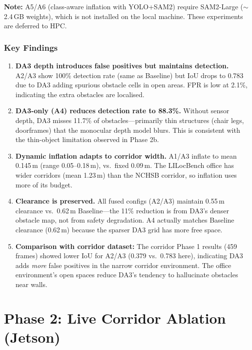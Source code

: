 \documentclass[11pt,a4paper]{article}
\begin{document}
\textbf{Note:} A5/A6 (class-aware inflation with YOLO+SAM2) require
SAM2-Large ($\sim$2.4\,GB weights), which is not installed on the local
machine.  These experiments are deferred to HPC.

\subsubsection{Key Findings}

\begin{enumerate}[nosep]
  \item \textbf{DA3 depth introduces false positives but maintains
    detection.}  A2/A3 show 100\% detection rate (same as Baseline) but
    IoU drops to 0.783 due to DA3 adding spurious obstacle cells in open
    areas.  FPR is low at 2.1\%, indicating the extra obstacles are
    localised.

  \item \textbf{DA3-only (A4) reduces detection rate to 88.3\%.}  Without
    sensor depth, DA3 misses 11.7\% of obstacles---primarily thin
    structures (chair legs, doorframes) that the monocular depth model
    blurs.  This is consistent with the thin-object limitation observed
    in Phase 2b.

  \item \textbf{Dynamic inflation adapts to corridor width.}  A1/A3
    inflate to mean 0.145\,m (range 0.05--0.18\,m), vs.\ fixed 0.09\,m.
    The LILocBench office has wider corridors (mean 1.23\,m) than the
    NCHSB corridor, so inflation uses more of its budget.

  \item \textbf{Clearance is preserved.}  All fused configs (A2/A3)
    maintain 0.55\,m clearance vs.\ 0.62\,m Baseline---the 11\% reduction
    is from DA3's denser obstacle map, not from safety degradation.
    A4 actually matches Baseline clearance (0.62\,m) because the sparser
    DA3 grid has more free space.

  \item \textbf{Comparison with corridor dataset:}  The corridor Phase 1
    results (459 frames) showed lower IoU for A2/A3 (0.379 vs.\ 0.783
    here), indicating DA3 adds \emph{more} false positives in the narrow
    corridor environment.  The office environment's open spaces reduce
    DA3's tendency to hallucinate obstacles near walls.
\end{enumerate}

\section{Phase 2: Live Corridor Ablation (Jetson)}
\label{sec:phase2}
\end{document}
